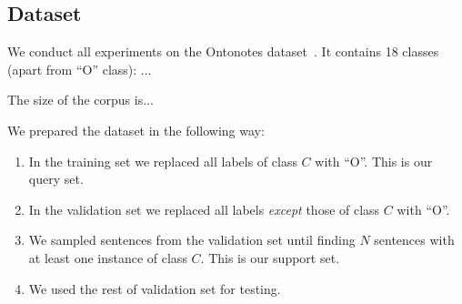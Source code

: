 
\subsection{Dataset}

We conduct all experiments on the Ontonotes dataset~\cite{ontonotes}. It contains 18 classes (apart from ``O'' class): ...

The size of the corpus is... 


We prepared the dataset in the following way:
\begin{enumerate}
  \item In the training set we replaced all labels of class $C$ with ``O''. This is our query set.
  \item In the validation set we replaced all labels \textit{except} those of class $C$ with ``O''.%
  \item We sampled sentences from the validation set until finding $N$ sentences with at least one instance of class $C$. This is our support set.
  \item We used the rest of validation set for testing.
\end{enumerate}

